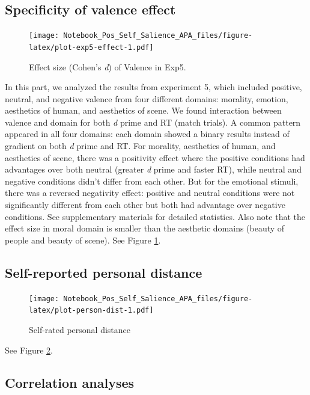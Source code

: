 \documentclass[
  english,
  man]{apa6}
\begin{document}
\hypertarget{specificity-of-valence-effect}{%
\subsection{Specificity of valence effect}\label{specificity-of-valence-effect}}

\begin{figure}
\centering
\texttt{[image: Notebook\_Pos\_Self\_Salience\_APA\_files/figure-latex/plot-exp5-effect-1.pdf]}
\caption{\label{fig:plot-exp5-effect}Effect size (Cohen's \emph{d}) of Valence in Exp5.}
\end{figure}

In this part, we analyzed the results from experiment 5, which included positive, neutral, and negative valence from four different domains: morality, emotion, aesthetics of human, and aesthetics of scene. We found interaction between valence and domain for both \emph{d} prime and RT (match trials). A common pattern appeared in all four domains: each domain showed a binary results instead of gradient on both \emph{d} prime and RT. For morality, aesthetics of human, and aesthetics of scene, there was a positivity effect where the positive conditions had advantages over both neutral (greater \emph{d} prime and faster RT), while neutral and negative conditions didn't differ from each other. But for the emotional stimuli, there was a reversed negativity effect: positive and neutral conditions were not significantly different from each other but both had advantage over negative conditions. See supplementary materials for detailed statistics. Also note that the effect size in moral domain is smaller than the aesthetic domains (beauty of people and beauty of scene). See Figure \ref{fig:plot-exp5-effect}.

\hypertarget{self-reported-personal-distance}{%
\subsection{Self-reported personal distance}\label{self-reported-personal-distance}}

\begin{figure}
\centering
\texttt{[image: Notebook\_Pos\_Self\_Salience\_APA\_files/figure-latex/plot-person-dist-1.pdf]}
\caption{\label{fig:plot-person-dist}Self-rated personal distance}
\end{figure}

See Figure \ref{fig:plot-person-dist}.

\hypertarget{correlation-analyses}{%
\subsection{Correlation analyses}\label{correlation-analyses}}
\end{document}
